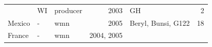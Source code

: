 \documentclass[fleqn,10pt,lineno]{wlpeerj} %
\theoremstyle{definition}
\theoremstyle{definition}
\theoremstyle{definition}
\theoremstyle{remark}
\begin{document}
\begin{longtable}[]{@{}lllrlr@{}}
\begin{minipage}[t]{0.11\columnwidth}
\end{minipage} & \begin{minipage}[t]{0.08\columnwidth}\raggedright\strut
WI\strut
\end{minipage} & \begin{minipage}[t]{0.12\columnwidth}\raggedright\strut
producer\strut
\end{minipage} & \begin{minipage}[t]{0.19\columnwidth}\raggedleft\strut
2003\strut
\end{minipage} & \begin{minipage}[t]{0.29\columnwidth}\raggedright\strut
GH\strut
\end{minipage} & \begin{minipage}[t]{0.04\columnwidth}\raggedleft\strut
2\strut
\end{minipage}\tabularnewline
\begin{minipage}[t]{0.11\columnwidth}\raggedright\strut
Mexico\strut
\end{minipage} & \begin{minipage}[t]{0.08\columnwidth}\raggedright\strut
-\strut
\end{minipage} & \begin{minipage}[t]{0.12\columnwidth}\raggedright\strut
wmn\strut
\end{minipage} & \begin{minipage}[t]{0.19\columnwidth}\raggedleft\strut
2005\strut
\end{minipage} & \begin{minipage}[t]{0.29\columnwidth}\raggedright\strut
Beryl, Bunsi, G122\strut
\end{minipage} & \begin{minipage}[t]{0.04\columnwidth}\raggedleft\strut
18\strut
\end{minipage}\tabularnewline
\begin{minipage}[t]{0.11\columnwidth}\raggedright\strut
France\strut
\end{minipage} & \begin{minipage}[t]{0.08\columnwidth}\raggedright\strut
-\strut
\end{minipage} & \begin{minipage}[t]{0.12\columnwidth}\raggedright\strut
wmn\strut
\end{minipage} & \begin{minipage}[t]{0.19\columnwidth}\raggedleft\strut
2004, 2005\strut
\end{minipage} & \begin{minipage}[t]{0.29\columnwidth}\raggedright\strut

\end{minipage}
\end{longtable}
\end{document}
